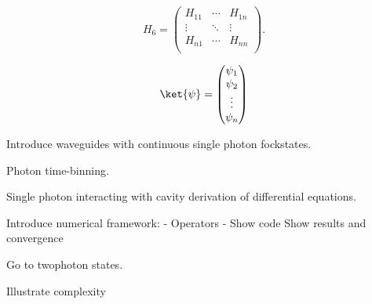 \begin{equation}
    H_6 = \begin{pmatrix}
H_{11} & \cdots & H_{1n} \\
\vdots & \ddots & \vdots \\
H_{n1} & \cdots & H_{nn} \\
\end{pmatrix}.
\end{equation}



\begin{equation}
    \ket{\psi} = \begin{pmatrix}
        \psi_1 \\ \psi_2 \\ \vdots \\ \psi_n
    \end{pmatrix}
\end{equation}





Introduce waveguides with continuous single photon fockstates.

Photon time-binning.

Single photon interacting with cavity derivation of differential equations. 

Introduce numerical framework:
 - Operators
 - Show code
Show results and convergence

Go to twophoton states.

Illustrate complexity
